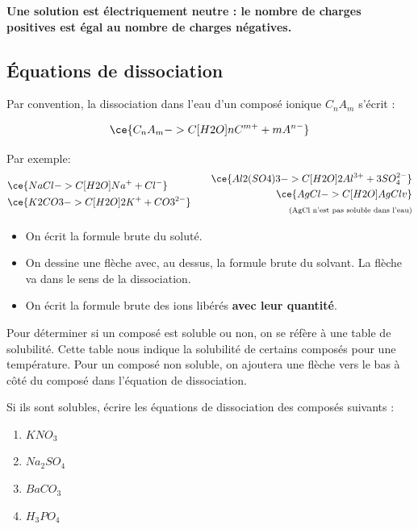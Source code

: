 \documentclass[
  11pt,
  a4paper,
  openany]{book}
\providecommand{\tightlist}{%
  \setlength{\itemsep}{0pt}\setlength{\parskip}{0pt}}
\begin{document}
\textbf{Une solution est électriquement neutre : le nombre de charges positives est égal au nombre de charges négatives.}

\hypertarget{uxe9quations-de-dissociation}{%
\subsection{Équations de dissociation}\label{uxe9quations-de-dissociation}}

Par convention, la dissociation dans l'eau d'un composé ionique \(C_nA_m\) s'écrit :

\[ \ce{C_{n}A_{m} ->C[H2O] n C^{m+} + m A^{n-}} \]

Par exemple:
\[ \begin{split}
  & \ce{NaCl ->C[H2O] Na^{+} + Cl^{-} } \\
  & \ce{K2CO3 ->C[H2O] 2 K^{+} + CO3^{2-} }
  \end{split}
  \qquad
  \begin{split}
  \ce{Al2(SO4)3 ->C[H2O] 2 Al^{3+} + 3 SO_{4}^{2-} } \\
  \ce{AgCl ->C[H2O] AgCl v } \\
  {\scriptsize \text{(AgCl n'est pas soluble dans l'eau)}}
  \end{split} \]

\begin{itemize}
\tightlist
\item
  On écrit la formule brute du soluté.
\item
  On dessine une flèche avec, au dessus, la formule brute du solvant. La flèche va dans le sens de la dissociation.
\item
  On écrit la formule brute des ions libérés \textbf{avec leur quantité}.
\end{itemize}

Pour déterminer si un composé est soluble ou non, on se réfère à une table de solubilité. Cette table nous indique la solubilité de certains composés pour une température. Pour un composé non soluble, on ajoutera une flèche vers le bas à côté du composé dans l'équation de dissociation.

\begin{Exercise}

Si ils sont solubles, écrire les équations de dissociation des composés suivants :

\begin{enumerate}
\def\labelenumi{\arabic{enumi}.}
\item
  \(KNO_3\)
\item
  \(Na_2SO_4\)
\item
  \(BaCO_3\)
\item
  \(H_3PO_4\)
\end{enumerate}

\end{Exercise}
\end{document}
